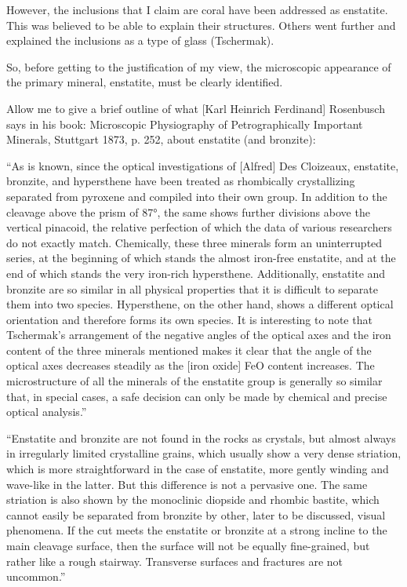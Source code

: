 \documentclass[a4paper, 12pt, oneside]{article}
\begin{document}
However, the inclusions that I claim are coral have been addressed as enstatite. This was believed to be able to explain their structures. Others went further and explained the inclusions as a type of glass (Tschermak).

So, before getting to the justification of my view, the microscopic appearance of the primary mineral, enstatite, must be clearly identified.

Allow me to give a brief outline of what [Karl Heinrich Ferdinand] Rosenbusch says in his book: Microscopic Physiography of Petrographically Important Minerals, Stuttgart 1873, p. 252, about enstatite (and bronzite):

``As is known, since the optical investigations of [Alfred] Des Cloizeaux, enstatite, bronzite, and hypersthene have been treated as rhombically crystallizing separated from pyroxene and compiled into their own group. In addition to the cleavage above the prism of 87°, the same shows further divisions above the vertical pinacoid, the relative perfection of which the data of various researchers do not exactly match. Chemically, these three minerals form an uninterrupted series, at the beginning of which stands the almost iron-free enstatite, and at the end of which stands the very iron-rich hypersthene. Additionally, enstatite and bronzite are so similar in all physical properties that it is difficult to separate them into two species. Hypersthene, on the other hand, shows a different optical orientation and therefore forms its own species. It is interesting to note that Tschermak's arrangement of the negative angles of the optical axes and the iron content of the three minerals mentioned makes it clear that the angle of the optical axes decreases steadily as the [iron oxide] FeO content increases. The microstructure of all the minerals of the enstatite group is generally so similar that, in special cases, a safe decision can only be made by chemical and precise optical analysis.''

``Enstatite and bronzite are not found in the rocks as crystals, but almost always in irregularly limited crystalline grains, which usually show a very dense striation, which is more straightforward in the case of enstatite, more gently winding and wave-like in the latter. But this difference is not a pervasive one. The same striation is also shown by the monoclinic diopside and rhombic bastite, which cannot easily be separated from bronzite by other, later to be discussed, visual phenomena. If the cut meets the enstatite or bronzite at a strong incline to the main cleavage surface, then the surface will not be equally fine-grained, but rather like a rough stairway. Transverse surfaces and fractures are not uncommon.''
\end{document}
